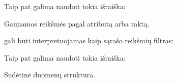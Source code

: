 \documentclass[letterpaper,10pt,lithuanian]{sphinxmanual}
\begin{document}

\begin{fulllineitems}
\label{\detokenize{formules:getitem}}
\pysigstartsignatures
\pysiglinewithargsret
{}
{\sphinxparamcomma {}}
{}
\pysigstopsignatures
\sphinxAtStartPar
Taip pat galima naudoti tokia išraiška:

\begin{sphinxVerbatim}[commandchars=\\\{\}]
\PYG{p}{[}\PYG{p}{]}
\end{sphinxVerbatim}

\sphinxAtStartPar
Gaunamos reikšmės pagal atributą arba raktą.

\sphinxAtStartPar
{\hyperref[\detokenize{formules:id22}]{}} gali būti interpretuojamas kaip sąrašo reikšmių filtras:

\begin{sphinxVerbatim}[commandchars=\\\{\}]
\PYG{p}{[}  \PYG{p}{]}
\end{sphinxVerbatim}

\end{fulllineitems}


\begin{fulllineitems}
\label{\detokenize{formules:dict}}
\pysigstartsignatures
\pysiglinewithargsret
{}
{}
{}
\pysigstopsignatures
\sphinxAtStartPar
Taip pat galima naudoti tokia išraiška:

\begin{sphinxVerbatim}[commandchars=\\\{\}]
 
\end{sphinxVerbatim}

\sphinxAtStartPar
Sudėtinė duomenų struktūra.

\end{fulllineitems}
\end{document}
